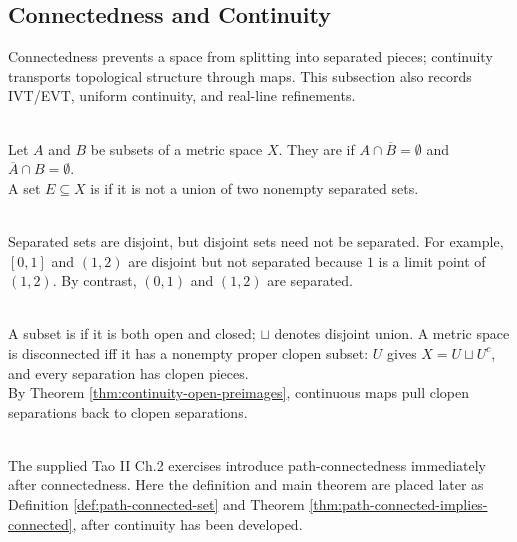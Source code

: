 \subsection{Connectedness and Continuity}

%


Connectedness prevents a space from splitting into separated pieces; continuity transports topological structure through maps. This subsection also records IVT/EVT, uniform continuity, and real-line refinements.

\begin{definition} \label{def:separated-and-connected-sets} \\
Let $A$ and $B$ be subsets of a metric space $X$. They are  if $A\cap\overline{B}=\emptyset$ and $\overline{A}\cap B=\emptyset$.\\
A set $E\subseteq X$ is  if it is not a union of two nonempty separated sets.
\end{definition}

\begin{remark} \label{rem:disjoint-versus-separated} \\
Separated sets are disjoint, but disjoint sets need not be separated. For example, $[0,1]$ and $(1,2)$ are disjoint but not separated because $1$ is a limit point of $(1,2)$. By contrast, $(0,1)$ and $(1,2)$ are separated.
\end{remark}

\begin{remark} \label{rem:connectedness-and-clopen-subsets} \\
A subset is  if it is both open and closed; $\sqcup$ denotes disjoint union. A metric space is disconnected iff it has a nonempty proper clopen subset: $U$ gives $X=U\sqcup U^c$, and every separation has clopen pieces.\\
By Theorem \ref{thm:continuity-open-preimages}, continuous maps pull clopen separations back to clopen separations.
\end{remark}

\begin{remark} \label{rem:path-connectedness-placed-with-continuity} \\
The supplied Tao II Ch.2 exercises introduce path-connectedness immediately after connectedness. Here the definition and main theorem are placed later as Definition \ref{def:path-connected-set} and Theorem \ref{thm:path-connected-implies-connected}, after continuity has been developed.
\end{remark}


